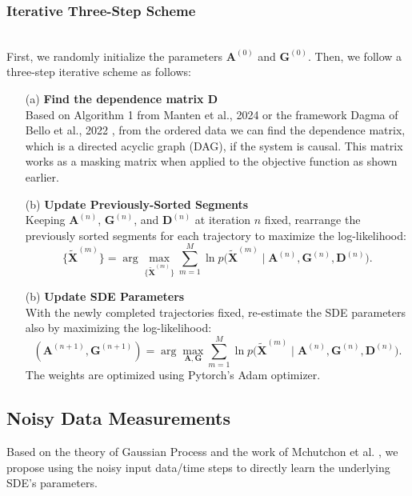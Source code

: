 \documentclass[a4paper, 11pt]{article}
\begin{document}
\begin{sloppypar}
\subsubsection{Iterative Three-Step Scheme} \mbox{}\\
First, we randomly initialize the parameters
$\mathbf{A}^{(0)}$ and $\mathbf{G}^{(0)}$. Then, we follow a three-step
iterative scheme as follows:
\begin{enumerate}
  \item[(a)] \textbf{Find the dependence matrix $\mathbf{D}$} \\
    Based on Algorithm 1 from Manten et al., 2024 \cite{manten2025signaturekernelconditionalindependence}
    or the framework Dagma of Bello et al., 2022 \cite{bello2023dagmalearningdagsmmatrices},
    from the ordered data we can find the dependence matrix, which is a directed acyclic graph (DAG), if
    the system is causal. This matrix works as a masking matrix when applied to the objective function as
    shown earlier.
  \item[(b)] \textbf{Update Previously-Sorted Segments} \\
    Keeping $\mathbf{A}^{(n)}$, $\mathbf{G}^{(n)}$, and $\mathbf{D}^{(n)}$ at iteration $n$ fixed, rearrange the
    previously sorted segments for each trajectory to maximize the log-likelihood:
    \[
    \{\widetilde{\mathbf{X}}^{(m)}\}
    = 
    \arg\max_{\{\widetilde{\mathbf{X}}^{(m)}\}}
    \sum_{m=1}^M
    \ln p\bigl(\widetilde{\mathbf{X}}^{(m)} \mid \mathbf{A}^{(n)}, \mathbf{G}^{(n)}, \mathbf{D}^{(n)}\bigr).
    \]
  \item[(b)] \textbf{Update SDE Parameters} \\
    With the newly completed trajectories fixed, re-estimate the SDE parameters also
    by maximizing the log-likelihood:
    \[
    (\mathbf{A}^{(n+1)}, \mathbf{G}^{(n+1)}) 
    = 
    \arg\max_{\mathbf{A}, \mathbf{G}}
    \sum_{m=1}^M
    \ln p\bigl(\widetilde{\mathbf{X}}^{(m)} \mid \mathbf{A}^{(n)}, \mathbf{G}^{(n)}, \mathbf{D}^{(n)}\bigr).
    \]
    The weights are optimized using Pytorch's Adam optimizer.
  \end{enumerate}

\subsection{Noisy Data Measurements}
Based on the theory of Gaussian Process and the work of Mchutchon et al. \cite{NIPS2011_a8e864d0},
we propose using the noisy input data/time steps to directly learn the underlying SDE's parameters.


\end{sloppypar}
\end{document}
